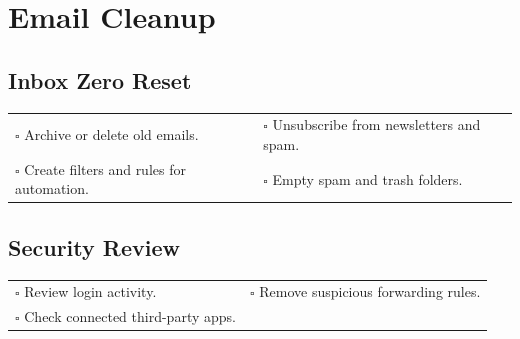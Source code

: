 
\section{Email Cleanup}
\label{sec:email}

\subsection{Inbox Zero Reset}

\begin{tabular}{p{9cm} p{8cm}}
$\square$ Archive or delete old emails. & $\square$ Unsubscribe from newsletters and spam. \\ 
$\square$ Create filters and rules for automation. & $\square$ Empty spam and trash folders. \\ 
\end{tabular}

\subsection{Security Review}

\begin{tabular}{p{9cm} p{8cm}}
$\square$ Review login activity. & $\square$ Remove suspicious forwarding rules. \\ 
$\square$ Check connected third-party apps. & \\ 
\end{tabular}


